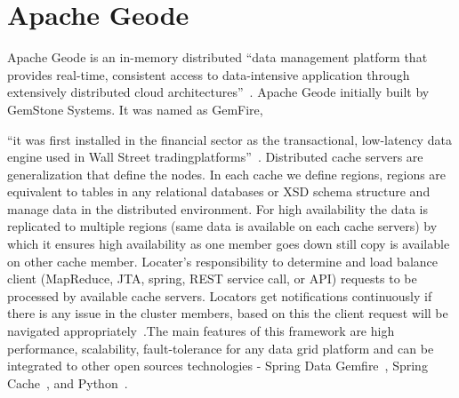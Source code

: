 \section{Apache Geode}

Apache Geode is an in-memory distributed ``data management platform
that provides real-time, consistent access to data-intensive
application through extensively distributed cloud
architectures''~\cite{hid-sp18-514-apachegeodewiki}. Apache Geode
initially built by GemStone Systems. It was named as GemFire, 

``it was
first installed in the financial sector as the transactional,
low-latency data engine used in Wall Street tradingplatforms''~\cite{hid-sp18-514-apachegeodewiki}.
Distributed cache servers are generalization that define the nodes. In
each cache we define regions, regions are equivalent to tables in any
relational databases or XSD schema structure and manage data in the
distributed environment. For high availability the data is replicated
to multiple regions (same data is available on each cache servers) by
which it ensures high availability as one member goes down still copy
is available on other cache member. Locater's responsibility to
determine and load balance client (MapReduce, JTA, spring, REST service
call, or API) requests to be processed by available cache servers.
Locators get notifications continuously if there is any issue in the
cluster members, based on this the client request will be navigated
appropriately~\cite{hid-sp18-514-apachegeodewiki}.The main features of
this framework are high performance, scalability, fault-tolerance for
any data grid platform and can be integrated to other open sources
technologies - Spring Data
Gemfire~\cite{hid-sp18-514-geodespringgemfire}, Spring
Cache~\cite{hid-sp18-514-geodespringcache}, and
Python~\cite{hid-sp18-514-geodepython}.
